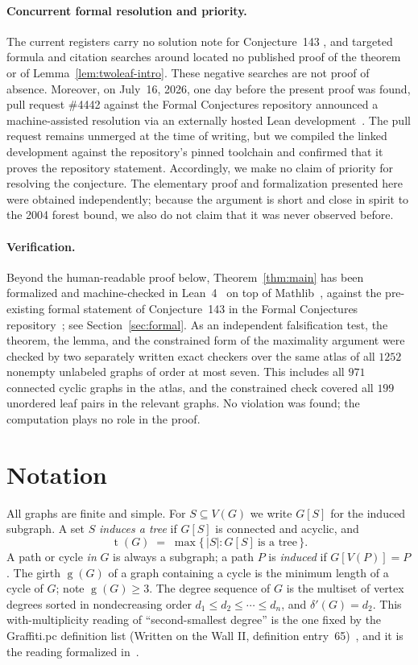 \documentclass[11pt]{article}
\numberwithin{equation}{section}
\theoremstyle{remark}
\newcommand{\tr}{\operatorname{t}}
\newcommand{\gr}{\operatorname{g}}
\newcommand{\dd}{\delta'}
\begin{document}
\paragraph{Concurrent formal resolution and priority.}
The current registers carry no solution note for Conjecture~143
\cite{WestReg,FC143}, and targeted formula and citation searches around
\cite{ESS86,DW04,HMS14} located no published proof of the theorem or of
Lemma~\ref{lem:twoleaf-intro}.  These negative searches are not proof of
absence.  Moreover, on July~16, 2026, one day before the present proof was
found, pull request \#4442 against the Formal Conjectures repository
announced a machine-assisted resolution via an externally hosted Lean
development~\cite{FC4442}.  The pull request remains unmerged at the time of
writing, but we compiled the linked development against the repository's
pinned toolchain and confirmed that it proves the repository statement.
Accordingly, we make no claim of priority for resolving the conjecture.  The
elementary proof and formalization presented here were obtained independently;
because the argument is short and close in spirit to the 2004 forest bound,
we also do not claim that it was never observed before.

\paragraph{Verification.}
Beyond the human-readable proof below, Theorem~\ref{thm:main} has been
formalized and machine-checked in Lean~4~\cite{Lean4} on top of
Mathlib~\cite{mathlib}, against the pre-existing formal statement of
Conjecture~143 in the Formal Conjectures repository~\cite{FC143}; see
Section~\ref{sec:formal}.  As an independent falsification test, the theorem,
the lemma, and the constrained form of the maximality argument were checked by
two separately written exact checkers over the same atlas of all $1252$ nonempty unlabeled graphs of
order at most seven.  This includes all $971$ connected cyclic graphs in the
atlas, and the constrained check covered all $199$ unordered leaf pairs in
the relevant graphs.  No violation was found; the computation plays no role
in the proof.

\section{Notation}

All graphs are finite and simple.  For $S\subseteq V(G)$ we write $G[S]$ for
the induced subgraph.  A set $S$ \emph{induces a tree} if $G[S]$ is connected
and acyclic, and
\[
  \tr(G)\;=\;\max\{\,|S| : G[S]\ \text{is a tree}\,\}.
\]
A path or cycle \emph{in} $G$ is always a subgraph; a path $P$ is
\emph{induced} if $G[V(P)]=P$.  The girth $\gr(G)$ of a graph containing a
cycle is the minimum length of a cycle of $G$; note $\gr(G)\ge3$.  The degree
sequence of $G$ is the multiset of vertex degrees sorted in nondecreasing
order $d_1\le d_2\le\cdots\le d_n$, and $\dd(G)=d_2$.  This with-multiplicity
reading of ``second-smallest degree'' is the one fixed by the Graffiti.pc
definition list (Written on the Wall II, definition entry~65)~\cite{WOWII},
and it is the reading formalized in~\cite{FC143}.
\end{document}
